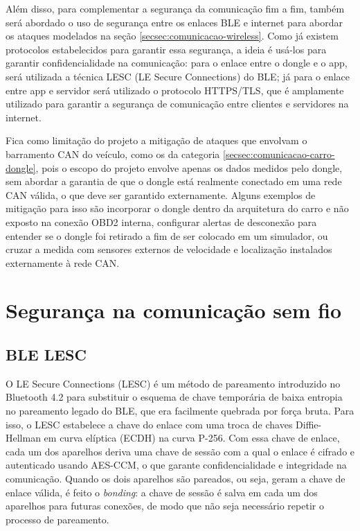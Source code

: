 \documentclass[
	12pt,
	article,			%
	oneside,
	a4paper,
	english,
	brazil				%
	]{abntex2}
\begin{document}
Além disso, para complementar a segurança da comunicação fim a fim, também será abordado o uso de segurança entre os enlaces BLE e internet para abordar os ataques 
modelados na seção \ref{secsec:comunicacao-wireless}. Como já existem protocolos estabelecidos para garantir essa segurança, a ideia é usá-los para garantir
confidencialidade na comunicação: para o enlace entre o dongle e o app, será utilizada a técnica LESC (LE Secure Connections) do BLE; já para o enlace entre app e servidor
será utilizado o protocolo HTTPS/TLS, que é amplamente utilizado para garantir a segurança de comunicação entre clientes e servidores na internet.

Fica como limitação do projeto a mitigação de ataques que envolvam o barramento CAN do veículo, como os da categoria \ref{secsec:comunicacao-carro-dongle},
pois o escopo do projeto envolve apenas os dados medidos pelo dongle, sem abordar a garantia de que o dongle está realmente conectado em uma rede CAN válida, o
que deve ser garantido externamente. Alguns exemplos de mitigação para isso são incorporar o dongle dentro da arquitetura do carro e não exposto na conexão OBD2 interna,
configurar alertas de desconexão para entender se o dongle foi retirado a fim de ser colocado em um simulador, ou cruzar a medida com sensores externos de velocidade e 
localização instalados externamente à rede CAN.

\section{Segurança na comunicação sem fio}

\subsection{BLE LESC}

O LE Secure Connections (LESC) é um método de pareamento introduzido no Bluetooth 4.2 para substituir o esquema de chave temporária de baixa entropia no pareamento legado
do BLE, que era facilmente quebrada por força bruta. Para isso, o LESC estabelece a chave do enlace com uma troca de chaves Diffie-Hellman em curva elíptica (ECDH)
na curva P-256. Com essa chave de enlace, cada um dos aparelhos deriva uma chave de sessão com a qual o enlace é cifrado e autenticado usando AES-CCM, o que garante 
confidencialidade e integridade na comunicação. Quando os dois aparelhos são pareados, ou seja, geram a chave de enlace válida, é feito o \textit{bonding}: a chave de sessão
é salva em cada um dos aparelhos para futuras conexões, de modo que não seja necessário repetir o processo de pareamento.
\end{document}
